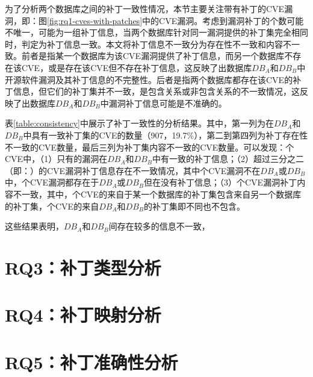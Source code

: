 为了分析两个数据库之间的补丁一致性情况，本节主要关注带有补丁的CVE漏洞，即：图\ref{fig:rq1-cves-with-patches}中的CVE漏洞。考虑到漏洞补丁的个数可能不唯一，可能为一组补丁信息，当两个数据库针对同一漏洞提供的补丁集完全相同时，判定为补丁信息一致。本文将补丁信息不一致分为存在性不一致和内容不一致。前者是指某一个数据库为该CVE漏洞提供了补丁信息，而另一个数据库不存在该CVE，或是存在该CVE但不存在补丁信息，这反映了出数据库$DB_A$和$DB_B$中开源软件漏洞及其补丁信息的不完整性。后者是指两个数据库都存在该CVE的补丁信息，但它们的补丁集并不一致，是包含关系或非包含关系的不一致情况，这反映了出数据库$DB_A$和$DB_B$中漏洞补丁信息可能是不准确的。


表\ref{table:consistency}中展示了补丁一致性的分析结果。其中，第一列为在$DB_A$和$DB_B$中具有一致补丁集的CVE的数量（907，19.7\%），第二到第四列为补丁存在性不一致的CVE数量，最后三列为补丁集内容不一致的CVE数量。可以发现：个CVE中，（1）只有的漏洞在$DB_A$和$DB_B$中有一致的补丁信息；（2）超过三分之二（即：）的CVE漏洞补丁信息存在不一致情况，其中个CVE漏洞不在$DB_{A}$或$DB_{B}$中，个CVE漏洞都存在于$DB_{A}$或$DB_{B}$但在没有补丁信息；（3）个CVE漏洞补丁内容不一致，其中，个CVE的来自于某一个数据库的补丁集包含来自另一个数据库的补丁集，个CVE的来自$DB_{A}$和$DB_{B}$的补丁集即不同也不包含。

这些结果表明，$DB_A$和$DB_B$间存在较多的信息不一致，


\section{RQ3：补丁类型分析}\label{sec:type}

\section{RQ4：补丁映射分析}\label{sec:cardinality}

\section{RQ5：补丁准确性分析}\label{sec:accuracy}
